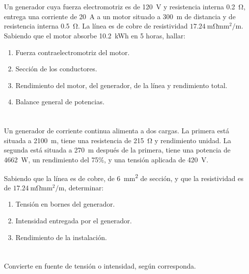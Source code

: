 \documentclass[10pt]{article}
\begin{document}
\title{}

\date{Curso 2020-21}

\section{}

Un generador cuya fuerza electromotriz es de \SI{120}{V} y resistencia interna \SI{0.2}{\ohm}, entrega una corriente de \SI{20}{\ampere} a un motor situado a \SI{300}{\meter} de distancia y de resistencia interna \SI{0.5}{\ohm}. La línea es de cobre de resistividad $\SI{17.24}{\milli\ohm\milli\meter\squared\per\meter}$. Sabiendo que el motor absorbe \SI{10.2}{\kWh} en 5 horas, hallar: 
\begin{enumerate}
\item Fuerza contraelectromotriz del motor.
\item Sección de los conductores.
\item Rendimiento del motor, del generador, de la línea y rendimiento total.
\item Balance general de potencias.
\end{enumerate}

\section{}
Un generador de corriente continua alimenta a dos cargas. La primera está situada a \SI{2100}{\meter}, tiene una resistencia de \SI{215}{\ohm} y rendimiento unidad. La segunda está situada a \SI{270}{\meter} después de la primera, tiene una potencia de \SI{4662}{\watt}, un rendimiento del 75\%, y una tensión aplicada de \SI{420}{\volt}.

Sabiendo que la línea es de cobre, de \SI{6}{\milli\meter\squared} de sección, y que la resistividad es de $\SI{17.24}{\milli\ohm\milli\meter\squared\per\meter}$, determinar:

\begin{enumerate}
\item Tensión en bornes del generador.
\item Intensidad entregada por el generador.
\item Rendimiento de la instalación.
\end{enumerate}

\section{}

Convierte en fuente de tensión o intensidad, según corresponda.
\end{document}
